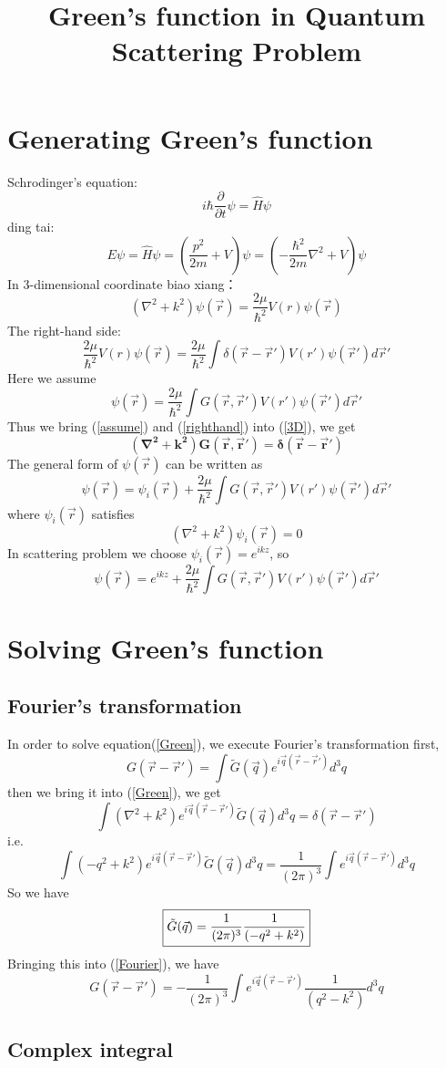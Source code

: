 \documentclass{article}
\title{Green's function in Quantum Scattering Problem}
\author{}
\date{}
\newcommand{\be}{\begin{equation}}
\newcommand{\ee}{\end{equation}}
\begin{document}
\maketitle

\section{Generating Green's function}
Schrodinger's equation:
\be
i\hbar\frac{\partial}{\partial t}\psi=\hat{H}\psi
\ee
ding tai:
\be
E\psi=\hat H\psi=(\frac{p^2}{2m}+V)\psi=(-\frac{\hbar^2}{2m}\nabla^2+V)\psi
\ee
In 3-dimensional coordinate biao xiang：
\be
(\nabla^2+k^2)\psi(\vec{r})=\frac{2\mu}{\hbar^2}V(r)\psi(\vec{r})
\label{3D}
\ee
The right-hand side:
\be
\frac{2\mu}{\hbar^2}V(r)\psi(\vec{r})=\frac{2\mu}{\hbar^2}\int \delta(\vec{r}-\vec{r}')V(r')\psi(\vec{r}') d\vec{r}' 
\label{righthand}
\ee
Here we assume
\be
\psi(\vec{r})=\frac{2\mu}{\hbar^2}\int G(\vec{r},\vec{r}')V(r')\psi(\vec{r}') d\vec{r}' 
\label{assume}
\ee
Thus we bring (\ref{assume}) and (\ref{righthand}) into (\ref{3D}), we get
\be
\boxed{\bm{(\nabla^2+k^2)G(\vec{r},\vec{r}')=\delta(\vec{r}-\vec{r}')}}
\label{Green}
\ee
The general form of $\psi(\vec{r})$ can be written as
\be
\psi(\vec{r})=\psi_i(\vec{r})+\frac{2\mu}{\hbar^2}\int G(\vec{r},\vec{r}')V(r')\psi(\vec{r}') d\vec{r}' 
\ee
where $\psi_i(\vec{r})$ satisfies
\be
(\nabla^2+k^2)\psi_i(\vec{r})=0
\ee
In scattering problem we choose $\psi_i(\vec{r})=e^{ikz}$, so
\be
\psi(\vec{r})=e^{ikz}+\frac{2\mu}{\hbar^2}\int G(\vec{r},\vec{r}')V(r')\psi(\vec{r}') d\vec{r}'
\ee
\section{Solving Green's function}
\subsection{Fourier's transformation}
In order to solve equation(\ref{Green}), we execute Fourier's transformation first,
\be
G(\vec{r}-\vec{r}')=\int \tilde{G}(\vec{q}) e^{i\vec{q}(\vec{r}-\vec{r}')} d^3 q
\label{Fourier}
\ee
then we bring it into (\ref{Green}), we get
\be
\int (\nabla^2+k^2) e^{i\vec{q}(\vec{r}-\vec{r}')} \tilde{G}(\vec{q}) d^3 q=\delta(\vec{r}-\vec{r}')
\ee
i.e.
\be
\int (-q^2+k^2) e^{i\vec{q}(\vec{r}-\vec{r}')} \tilde{G}(\vec{q}) d^3 q=\frac{1}{(2\pi)^3}\int e^{i\vec{q}(\vec{r}-\vec{r}')}  d^3 q
\ee
So we have
\be
\fbox{$\displaystyle{\tilde{G}(\vec{q})=\frac{1}{(2\pi)^3}\frac{1}{(-q^2+k^2)}}$}
\ee
Bringing this into (\ref{Fourier}), we have
\be
G(\vec{r}-\vec{r}')=-\frac{1}{(2\pi)^3}\int e^{i\vec{q}(\vec{r}-\vec{r}')} \frac{1}{(q^2-k^2)} d^3 q
\ee
\subsection{Complex integral}
\end{document}
